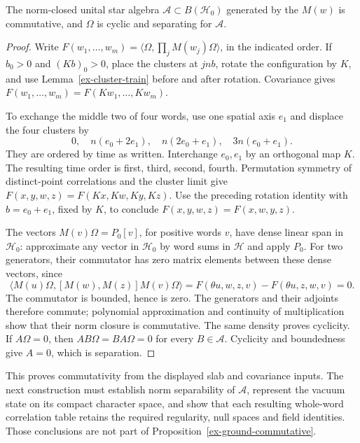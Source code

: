 \begin{proposition}[Commutativity]\label{ex-ground-commutative}
The norm-closed unital star algebra \(\mathcal A\subset B(\mathcal H_0)\)
generated by the \(M(w)\) is commutative, and \(\Omega\) is cyclic and
separating for \(\mathcal A\).
\end{proposition}
\begin{proof}
Write \(F(w_1,\ldots,w_m)=\langle\Omega,\prod_jM(w_j)\Omega\rangle\),
in the indicated order. If \(b_0>0\) and \((Kb)_0>0\), place the
clusters at \(jnb\), rotate the configuration by \(K\), and use
Lemma~\ref{ex-cluster-train} before and after rotation. Covariance gives
\(F(w_1,\ldots,w_m)=F(Kw_1,\ldots,Kw_m)\).

To exchange the middle two of four words, use one spatial axis \(e_1\)
and displace the four clusters by
\[
 0,\quad n(e_0+2e_1),\quad n(2e_0+e_1),\quad3n(e_0+e_1).
\]
They are ordered by time as written. Interchange \(e_0,e_1\) by an
orthogonal map \(K\). The resulting time order is first, third, second,
fourth. Permutation symmetry of distinct-point correlations and the
cluster limit give
\(F(x,y,w,z)=F(Kx,Kw,Ky,Kz)\).
Use the preceding rotation identity with \(b=e_0+e_1\), fixed by \(K\),
to conclude \(F(x,y,w,z)=F(x,w,y,z)\).

The vectors \(M(v)\Omega=P_0[v]\), for positive words \(v\), have
dense linear span in \(\mathcal H_0\): approximate any vector in
\(\mathcal H_0\) by word sums in \(\mathcal H\) and apply \(P_0\).
For two generators, their commutator has zero matrix elements between
these dense vectors, since
\[
 \langle M(u)\Omega,[M(w),M(z)]M(v)\Omega\rangle
 =F(\theta u,w,z,v)-F(\theta u,z,w,v)=0.
\]
The commutator is bounded, hence is zero. The generators and their
adjoints therefore commute; polynomial approximation and continuity of
multiplication show that their norm closure is commutative. The same
density proves cyclicity. If \(A\Omega=0\), then
\(AB\Omega=BA\Omega=0\) for every \(B\in\mathcal A\).
Cyclicity and boundedness give \(A=0\), which is separation.
\end{proof}

This proves commutativity from the displayed slab and covariance inputs.
The next construction must establish norm separability of \(\mathcal A\),
represent the vacuum state on its compact character space, and show that
each resulting whole-word correlation table retains the required
regularity, null spaces and field identities. Those conclusions are not
part of Proposition~\ref{ex-ground-commutative}.
